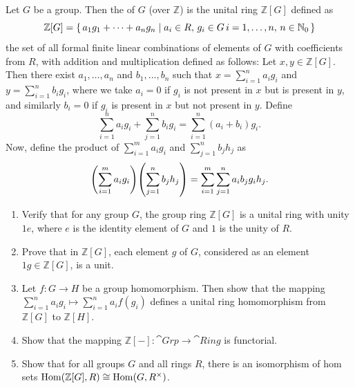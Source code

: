 Let $G$ be a group. Then the  of $G$ (over $\mathbb Z$) is the unital ring $\mathbb Z[G]$ defined as
\begin{equation*}
\mathbb Z[G] = \qty{\, a_1 g_1 + \cdots + a_n g_n \mid a_i \in R,\, g_i \in G\, i = 1, \ldots, n, \, n \in \mathbb N_0 \,}
\end{equation*}
the set of all formal finite linear combinations of elements of $G$ with coefficients from $R$, with addition and multiplication defined as follows: Let $x, y \in \mathbb Z[G]$. Then there exist $a_1, \ldots, a_n$ and $b_1, \ldots, b_n$ such that $x = \sum_{i=1}^n a_i g_i$ and $y = \sum_{i=1}^n b_i g_i$, where we take $a_i = 0$ if $g_i$ is not present in $x$ but is present in $y$, and similarly $b_i = 0$ if $g_i$ is present in $x$ but not present in $y$. Define
\begin{equation*}
\sum_{i=1}^n a_i g_i + \sum_{j=1}^n b_i g_i = \sum_{i=1}^n (a_i + b_i) g_i.
\end{equation*}
Now, define the product of $\sum_{i=1}^m a_i g_i$ and $\sum_{j = 1}^n b_j h_j$ as
\begin{equation*}
\pqty{\sum_{i=1}^m a_i g_i}\pqty{\sum_{j = 1}^n b_j h_j} = \sum_{i=1}^m \sum_{j=1}^n a_i b_j g_i h_j.
\end{equation*}

\begin{Exercise}
\begin{enumerate}
\item Verify that for any group $G$, the group ring $\mathbb Z[G]$ is a unital ring with unity $1e$, where $e$ is the identity element of $G$ and $1$ is the unity of $R$.
\item Prove that in $\mathbb Z[G]$, each element $g$ of $G$, considered as an element $1g \in \mathbb Z[G]$, is a unit.
\item Let $f \colon G \to H$ be a group homomorphism. Then show that the mapping $\sum_{i=1}^n a_i g_i \mapsto \sum_{i=1}^n a_i f(g_i)$ defines a unital ring homomorphism from $\mathbb Z[G]$ to $\mathbb Z[H]$.
\item Show that the mapping $\mathbb Z[-] \colon \cat{Grp} \to \cat{Ring}$ is functorial.
\item Show that for all groups $G$ and all rings $R$, there is an isomorphism of hom sets $\operatorname{Hom}(\mathbb Z[G], R) \cong \operatorname{Hom}(G, R^\times)$.
\end{enumerate}
\end{Exercise}


